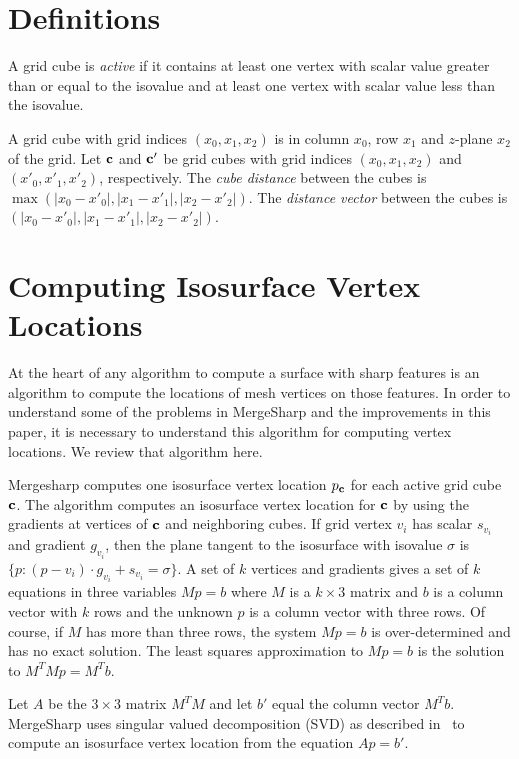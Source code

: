 
\section{Definitions}

A grid cube is {\em active} if it contains at least one vertex with scalar value greater than or equal to the isovalue
and at least one vertex with scalar value less than the isovalue.

A grid cube with grid indices $(x_0,x_1,x_2)$ is in column $x_0$, row $x_1$
and $z$-plane $x_2$ of the grid.
Let $\mathbf{c}$ and $\mathbf{c}'$ be grid cubes with grid indices $(x_0,x_1,x_2)$
and $(x'_0,x'_1,x'_2)$, respectively.
The {\em cube distance} between the cubes 
is $\max(|x_0-x'_0|, |x_1-x'_1|, |x_2-x'_2|)$.
The {\em distance vector} between the cubes is
$(|x_0-x'_0|, |x_1-x'_1|, |x_2-x'_2|)$.


\section{Computing Isosurface Vertex Locations}
\label{section:loc}

At the heart of any algorithm to compute a surface with sharp features 
is an algorithm to compute the locations of mesh vertices on those features.
In order to understand some of the problems in MergeSharp 
and the improvements in this paper,
it is necessary to understand this algorithm for computing vertex locations.
We review that algorithm here.

Mergesharp computes one isosurface vertex location $p_{\mathbf{c}}$
for each active grid cube $\mathbf{c}$.
The algorithm computes an isosurface vertex location for $\mathbf{c}$
by using the gradients at vertices of $\mathbf{c}$ and neighboring cubes.
If grid vertex $v_i$ has scalar $s_{v_i}$ and gradient $g_{v_i}$, 
then the plane tangent to the isosurface  with isovalue $\sigma$
is $\{p : (p-v_i) \cdot g_{v_i} + s_{v_i}= \sigma \}$.
A set of $k$ vertices and gradients gives a set of $k$ equations 
in three variables $M p = b$
where $M$ is a $k \times 3$ matrix 
and $b$ is a column vector with $k$ rows 
and the unknown $p$ is a column vector with three rows.
Of course, if $M$ has more than three rows,
the system $Mp = b$ is over-determined and has no exact solution.
The least squares approximation to $M p = b$ 
is the solution to $M^T M p = M^T b$.

Let $A$ be the $3 \times 3$ matrix $M^T M$ and 
let $b'$ equal the column vector $M^T b$.
MergeSharp uses singular valued decomposition (SVD)
as described in~\cite{jlsw-dchd-02,kbsh-fssev-01,l-oslpm-00}
to compute an isosurface vertex location from the equation $A p = b'$.

